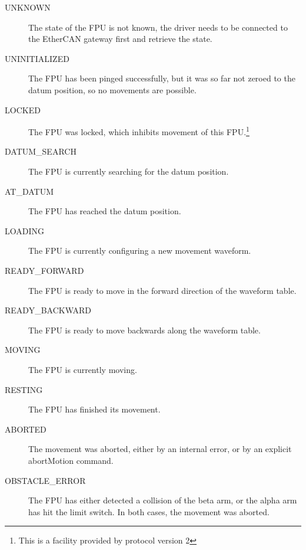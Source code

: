 \documentclass{scrartcl}[12pt,a4paper]
\begin{document}
\begin{description}
\item[UNKNOWN ] The state of the FPU is not known, the driver needs to
  be connected to the EtherCAN gateway first and retrieve the state.
  
\item[UNINITIALIZED ] The FPU has been pinged successfully, but it was
  so far not zeroed to the datum position, so no movements are
  possible.
\item[LOCKED ] The FPU was locked, which inhibits movement of this
  FPU.\footnote{This is a facility provided by protocol version 2}
\item[DATUM\_SEARCH ] The FPU is currently searching for the datum
  position.
\item[AT\_DATUM      ] The FPU has reached the datum position.
\item[LOADING ] The FPU is currently configuring a new movement waveform.
\item[READY\_FORWARD ] The FPU is ready to move in the forward
  direction of the waveform table.
\item[READY\_BACKWARD] The FPU is ready to move backwards along the
  waveform table.
\item[MOVING        ] The FPU is currently moving.
\item[RESTING       ] The FPU has finished its movement.
\item[ABORTED ] The movement was aborted, either by an internal error,
  or by an explicit abortMotion command.
\item[OBSTACLE\_ERROR] The FPU has either detected a collision of the
  beta arm, or the alpha arm has hit the limit switch. In both cases, the
  movement was aborted. 
\end{description}
\end{document}
